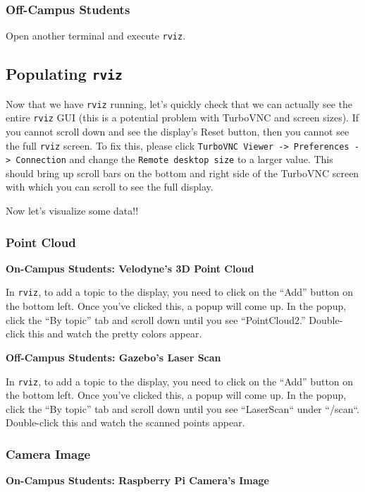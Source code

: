 \documentclass{article}
\begin{document}
\subsubsection{Off-Campus Students}

Open another terminal and execute \texttt{rviz}.

\subsection{Populating \texttt{rviz}}

Now that we have \texttt{rviz} running, let's quickly check that we can actually see the entire \texttt{rviz} GUI (this is a potential problem with TurboVNC and screen sizes). If you cannot scroll down and see the display's Reset button, then you cannot see the full \texttt{rviz} screen. To fix this, please click \texttt{TurboVNC Viewer -> Preferences -> Connection} and change the \texttt{Remote desktop size} to a larger value. This should bring up scroll bars on the bottom and right side of the TurboVNC screen with which you can scroll to see the full display.

Now let's visualize some data!!

\subsubsection{Point Cloud}

\textbf{On-Campus Students: Velodyne's 3D Point Cloud}

In \texttt{rviz}, to add a topic to the display, you need to click on the ``Add'' button on the bottom left. Once you've clicked this, a popup will come up. In the popup, click the ``By topic'' tab and scroll down until you see ``PointCloud2.'' Double-click this and watch the pretty colors appear.

\textbf{Off-Campus Students: Gazebo's Laser Scan}

In \texttt{rviz}, to add a topic to the display, you need to click on the ``Add'' button on the bottom left. Once you've clicked this, a popup will come up. In the popup, click the ``By topic'' tab and scroll down until you see ``LaserScan`` under ``/scan``. Double-click this and watch the scanned points appear.

\subsubsection{Camera Image}

\textbf{On-Campus Students: Raspberry Pi Camera's Image}
\end{document}
